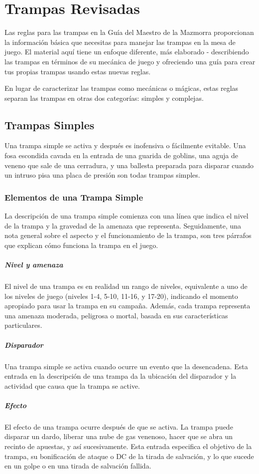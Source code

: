 \documentclass[a4paper,twocolumn,openany,10pt]{dndbook}
\begin{document}
\section{Trampas Revisadas}
Las reglas para las trampas en la Guía del Maestro de la Mazmorra proporcionan la información básica que necesitas para manejar
las trampas en la mesa de juego. El material aquí tiene un enfoque diferente, más elaborado - describiendo las trampas en
términos de su mecánica de juego y ofreciendo una guía para crear tus propias trampas usando estas nuevas reglas. 

En lugar de caracterizar las trampas como mecánicas o mágicas, estas reglas separan las trampas en otras dos categorías: simples
y complejas. 

\subsection{Trampas Simples}
Una trampa simple se activa y después es inofensiva o fácilmente evitable. Una fosa escondida cavada en la entrada de una guarida
de goblins, una aguja de veneno que sale de una cerradura, y una ballesta preparada para disparar cuando un intruso pisa una
placa de presión son todas trampas simples. 

\subsubsection{Elementos de una Trampa Simple}
La descripción de una trampa simple comienza con una línea que indica el nivel de la trampa y la gravedad de la amenaza que
representa. Seguidamente, una nota general sobre el aspecto y el funcionamiento de la trampa, son tres párrafos que explican cómo
funciona la trampa en el juego.

\subparagraph{Nivel y amenaza} El nivel de una trampa es en realidad un rango de niveles, equivalente a uno de los niveles de
juego (niveles 1-4, 5-10, 11-16, y 17-20), indicando el momento apropiado para usar la trampa en su campaña. Además, cada trampa
representa una amenaza moderada, peligrosa o mortal, basada en sus características particulares.

\subparagraph{Disparador} Una trampa simple se activa cuando ocurre un evento que la desencadena. Esta entrada en la descripción
de una trampa da la ubicación del disparador y la actividad que causa que la trampa se active.

\subparagraph{Efecto} El efecto de una trampa ocurre después de que se activa. La trampa puede disparar un dardo, liberar una
nube de gas venenoso, hacer que se abra un recinto de apuestas, y así sucesivamente. Esta entrada especifica el objetivo de la
trampa, su bonificación de ataque o DC de la tirada de salvación, y lo que sucede en un golpe o en una tirada de salvación
fallida.
\end{document}
